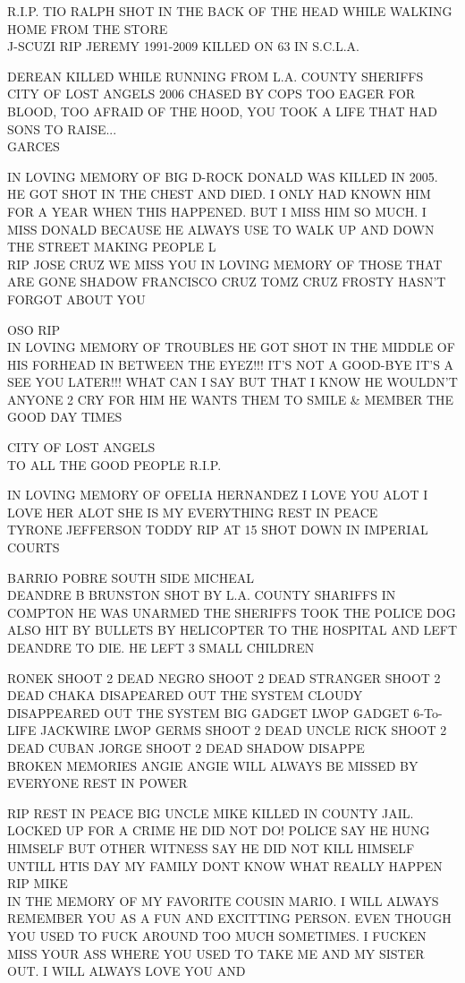 \documentclass[10pt,letterpaper]{article}
\begin{document}
R.I.P. TIO RALPH SHOT IN THE BACK OF THE HEAD WHILE WALKING HOME FROM THE STORE\\
J{-}SCUZI RIP JEREMY 1991{-}2009 KILLED ON 63 IN S.C.L.A.

DEREAN KILLED WHILE RUNNING FROM L.A. COUNTY SHERIFFS CITY OF LOST ANGELS 2006 CHASED BY COPS TOO EAGER FOR BLOOD, TOO AFRAID OF THE HOOD, YOU TOOK A LIFE THAT HAD SONS TO RAISE...\\
GARCES

IN LOVING MEMORY OF BIG D{-}ROCK DONALD WAS KILLED IN 2005.  HE GOT SHOT IN THE CHEST AND DIED.  I ONLY HAD KNOWN HIM FOR A YEAR WHEN THIS HAPPENED.  BUT I MISS HIM SO MUCH.  I MISS DONALD BECAUSE HE ALWAYS USE TO WALK UP AND DOWN THE STREET MAKING PEOPLE L\\
RIP JOSE CRUZ WE MISS YOU IN LOVING MEMORY OF THOSE THAT ARE GONE SHADOW FRANCISCO CRUZ TOMZ CRUZ FROSTY HASN'T FORGOT ABOUT YOU

OSO RIP\\
IN LOVING MEMORY OF TROUBLES HE GOT SHOT IN THE MIDDLE OF HIS FORHEAD IN BETWEEN THE EYEZ!!! IT'S NOT A GOOD{-}BYE IT'S A SEE YOU LATER!!! WHAT CAN I SAY BUT THAT I KNOW HE WOULDN'T ANYONE 2 CRY FOR HIM HE WANTS THEM TO SMILE \& MEMBER THE GOOD DAY TIMES

CITY OF LOST ANGELS\\
TO ALL THE GOOD PEOPLE R.I.P.

IN LOVING MEMORY OF OFELIA HERNANDEZ I LOVE YOU ALOT I LOVE HER ALOT SHE IS MY EVERYTHING REST IN PEACE\\
TYRONE JEFFERSON TODDY RIP AT 15 SHOT DOWN IN IMPERIAL COURTS

BARRIO POBRE SOUTH SIDE MICHEAL\\
DEANDRE B BRUNSTON SHOT BY L.A. COUNTY SHARIFFS IN COMPTON HE WAS UNARMED THE SHERIFFS TOOK THE POLICE DOG ALSO HIT BY BULLETS BY HELICOPTER TO THE HOSPITAL AND LEFT DEANDRE TO DIE.  HE LEFT 3 SMALL CHILDREN

RONEK SHOOT 2 DEAD NEGRO SHOOT 2 DEAD STRANGER SHOOT 2 DEAD CHAKA DISAPEARED OUT THE SYSTEM CLOUDY DISAPPEARED OUT THE SYSTEM BIG GADGET LWOP GADGET 6{-}To{-}LIFE JACKWIRE LWOP GERMS SHOOT 2 DEAD UNCLE RICK SHOOT 2 DEAD CUBAN JORGE SHOOT 2 DEAD SHADOW DISAPPE\\
BROKEN MEMORIES ANGIE ANGIE WILL ALWAYS BE MISSED BY EVERYONE REST IN POWER

RIP REST IN PEACE BIG UNCLE MIKE KILLED IN COUNTY JAIL.  LOCKED UP FOR A CRIME HE DID NOT DO!  POLICE SAY HE HUNG HIMSELF BUT OTHER WITNESS SAY HE DID NOT KILL HIMSELF UNTILL HTIS DAY MY FAMILY DONT KNOW WHAT REALLY HAPPEN RIP MIKE\\
IN THE MEMORY OF MY FAVORITE COUSIN MARIO.  I WILL ALWAYS REMEMBER YOU AS A FUN AND EXCITTING PERSON.  EVEN THOUGH YOU USED TO FUCK AROUND TOO MUCH SOMETIMES.  I FUCKEN MISS YOUR ASS WHERE YOU USED TO TAKE ME AND MY SISTER OUT.  I WILL ALWAYS LOVE YOU AND
\end{document}
